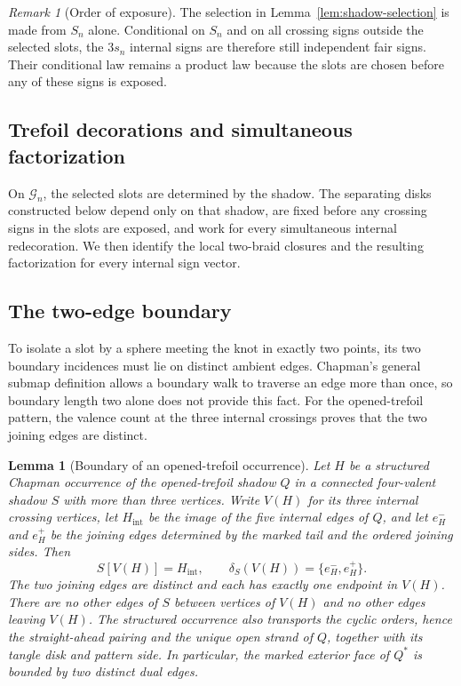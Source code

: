 \documentclass[9pt,twoside]{pnas-new}
\newtheorem{lemma}[theorem]{Lemma}
\theoremstyle{definition}
\theoremstyle{remark}
\newtheorem{remark}[theorem]{Remark}
\begin{document}
\begin{remark}[Order of exposure]
\label{rem:order-of-exposure}
The selection in Lemma~\ref{lem:shadow-selection} is made from $S_n$ alone. Conditional on $S_n$ and on all crossing signs outside the selected slots, the $3s_n$ internal signs are therefore still independent fair signs. Their conditional law remains a product law because the slots are chosen before any of these signs is exposed.
\end{remark}


\subsection{Trefoil decorations and simultaneous factorization}
On $\mathcal G_n$, the selected slots are determined by the shadow. The separating disks constructed below depend only on that shadow, are fixed before any crossing signs in the slots are exposed, and work for every simultaneous internal redecoration. We then identify the local two-braid closures and the resulting factorization for every internal sign vector.


\subsection{The two-edge boundary}
To isolate a slot by a sphere meeting the knot in exactly two points, its two boundary incidences must lie on distinct ambient edges. Chapman's general submap definition allows a boundary walk to traverse an edge more than once, so boundary length two alone does not provide this fact. For the opened-trefoil pattern, the valence count at the three internal crossings proves that the two joining edges are distinct.

\begin{lemma}[Boundary of an opened-trefoil occurrence]
\label{lem:genuine-two-edge}
Let $H$ be a structured Chapman occurrence of the opened-trefoil shadow $Q$ in a connected four-valent shadow $S$ with more than three vertices. Write $V(H)$ for its three internal crossing vertices, let $H_{\mathrm{int}}$ be the image of the five internal edges of $Q$, and let $e_H^-$ and $e_H^+$ be the joining edges determined by the marked tail and the ordered joining sides. Then
\[
 S[V(H)]=H_{\mathrm{int}},
 \qquad
 \delta_S(V(H))=\{e_H^-,e_H^+\}.
\]
The two joining edges are distinct and each has exactly one endpoint in $V(H)$. There are no other edges of $S$ between vertices of $V(H)$ and no other edges leaving $V(H)$. The structured occurrence also transports the cyclic orders, hence the straight-ahead pairing and the unique open strand of $Q$, together with its tangle disk and pattern side. In particular, the marked exterior face of $Q^*$ is bounded by two distinct dual edges.
\end{lemma}
\end{document}
